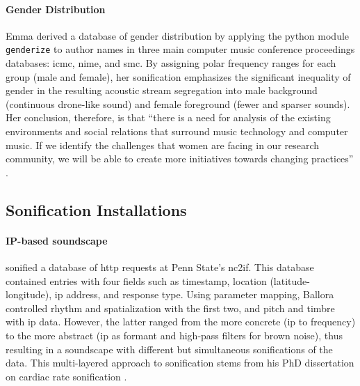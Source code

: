 \documentclass[
]{book}
\begin{document}
\paragraph{Gender Distribution}
Emma \textcite{Fri17:Son} derived a database of gender distribution by applying the python module \texttt{genderize} to author names in three main computer music conference proceedings databases: \gls{icmc}, \gls{nime}, and \gls{smc}. By assigning polar frequency ranges for each group (male and female), her sonification emphasizes the significant inequality of gender in the resulting acoustic stream segregation into male background (continuous drone-like sound) and female foreground (fewer and sparser sounds). Her conclusion, therefore, is that ``there is a need for analysis of the existing environments and social relations that surround music technology and computer music. If we identify the challenges that women are facing in our research community, we will be able to create more initiatives towards changing practices'' \parencite[238]{Fri17:Son}.

\subsection{Sonification Installations}
\label{sonification:installations}

% 
% 

\paragraph{IP-based soundscape}
\textcite{icmc/bbp2372.2010.117} sonified a database of \gls{http} requests at Penn State's \gls{nc2if}. This database contained entries with four fields such as timestamp, location (latitude-longitude), \gls{ip} address, and response type. Using parameter mapping, Ballora controlled rhythm and spatialization with the first two, and pitch and timbre with \gls{ip} data. However, the latter ranged from the more concrete (\gls{ip} to frequency) to the more abstract (\gls{ip} as formant and high-pass filters for brown noise), thus resulting in a soundscape with different but simultaneous sonifications of the data. This multi-layered approach to sonification stems from his PhD dissertation on cardiac rate sonification \parencite{Ballora/2000/phdthesis}.
\end{document}
